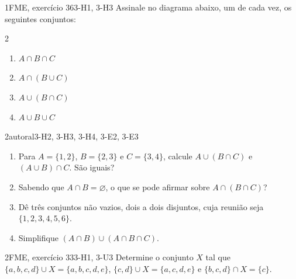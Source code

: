 \begin{questao}{1}{FME, exercício 36}{3-H1, 3-H3}\label{u3:fme36}
Assinale no diagrama abaixo, um de cada vez, os seguintes conjuntos:
\begin{multicols}{2}
\begin{enumerate}[label=\alph*)]
  \item $A\cap B\cap C$
  \item $A\cap(B\cup C)$
  \item $A\cup(B\cap C)$
  \item $A\cup B\cup C$
\end{enumerate}
\end{multicols}
\begin{center}
\end{center}
\end{questao}

\begin{questao}{2}{autoral}{3-H2, 3-H3, 3-H4, 3-E2, 3-E3}\label{u3:comparar}
\begin{enumerate}[label=\alph*)]
  \item Para $A=\{1,2\}$, $B=\{2,3\}$ e $C=\{3,4\}$, calcule $A\cup(B\cap C)$ e $(A\cup B)\cap C$. São iguais?
  \item Sabendo que $A\cap B=\varnothing$, o que se pode afirmar sobre $A\cap(B\cap C)$?
  \item Dê três conjuntos não vazios, dois a dois disjuntos, cuja reunião seja $\{1,2,3,4,5,6\}$.
  \item Simplifique $(A\cap B)\cup(A\cap B\cap C)$.
\end{enumerate}
\end{questao}

\begin{questao}{2}{FME, exercício 33}{3-H1, 3-U3}\label{u3:fme33}
Determine o conjunto $X$ tal que $\{a,b,c,d\}\cup X=\{a,b,c,d,e\}$, $\{c,d\}\cup X=\{a,c,d,e\}$ e $\{b,c,d\}\cap X=\{c\}$.
\end{questao}

